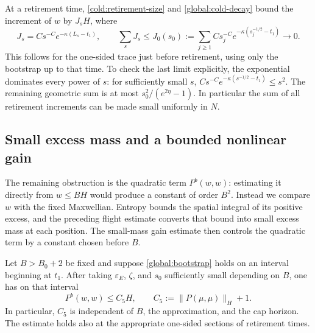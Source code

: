 At a retirement time, \cref{cold:retirement-size} and
\eqref{global:cold-decay} bound the increment of $w$ by $J_sH$, where
\begin{equation}\label{global:retirement}
 J_s=C s^{-C}e^{-\kappa(L_s-t_1)},\qquad
 \sum_sJ_s\le J_0(s_0):=
 \sum_{j\ge1}C s_j^{-C}e^{-\kappa(s_j^{-1/2}-t_1)}\longrightarrow0.
\end{equation}
This follows for the one-sided trace just before retirement, using
only the bootstrap up to that time.  To check the last limit explicitly,
the exponential dominates every power of $s$: for sufficiently small
$s$, $Cs^{-C}e^{-\kappa(s^{-1/2}-t_1)}\le s^2$.  The remaining geometric
sum is at most $s_0^2/(e^{2\eta}-1)$.  In particular the sum of all
retirement increments can be made small uniformly in $N$.

\subsection{Small excess mass and a bounded nonlinear gain}

The remaining obstruction is the quadratic term $P^b(w,w)$: estimating
it directly from $w\le BH$ would produce a constant of order $B^2$.
Instead we compare $w$ with the fixed Maxwellian.  Entropy bounds the
spatial integral of its positive excess, and the preceding flight
estimate converts that bound into small excess mass at each position.
The small-mass gain estimate then controls the quadratic term by a
constant chosen before $B$.

\begin{lemma}\label{global:gain}
Let $B>B_0+2$ be fixed and suppose \eqref{global:bootstrap} holds on an
interval beginning at $t_1$.  After taking
$\varepsilon_E$, $\zeta$, and $s_0$ sufficiently small depending on $B$,
one has on that interval
\begin{equation}\label{global:gain-bound}
 P^b(w,w)\le C_5H,
 \qquad C_5:=\|P(\mu,\mu)\|_H+1.
\end{equation}
In particular, $C_5$ is independent of $B$, the approximation, and the
cap horizon.  The estimate holds also at the appropriate one-sided
sections of retirement times.
\end{lemma}

